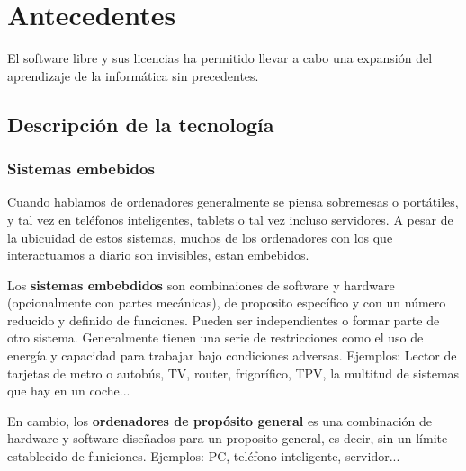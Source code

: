 \chapter{Antecedentes}


El software libre y sus licencias \cite{gplv3} ha permitido llevar a cabo una expansión del
aprendizaje de la informática sin precedentes.

\section{Descripción de la tecnología}
\subsection{Sistemas embebidos}
Cuando hablamos de ordenadores generalmente se piensa sobremesas o portátiles, y tal vez en teléfonos inteligentes, tablets o tal vez incluso servidores. A pesar de la ubicuidad de estos sistemas, muchos de los ordenadores con los que interactuamos a diario son invisibles, estan embebidos.

Los \textbf{sistemas embebdidos} son combinaiones de software y hardware (opcionalmente con partes mecánicas), de proposito específico y con un número reducido y definido de funciones. Pueden ser independientes o formar parte de otro sistema. Generalmente tienen una serie de restricciones como el uso de energía y capacidad para trabajar bajo condiciones adversas. Ejemplos: Lector de tarjetas de metro o autobús, TV, router, frigorífico, TPV, la multitud de sistemas que hay en un coche... \cite{es_glossary} \cite{marwedel}

En cambio, los \textbf{ordenadores de propósito general} es una combinación de hardware y software diseñados para un proposito general, es decir, sin un límite establecido de funiciones. Ejemplos: PC, teléfono inteligente, servidor... \cite{es_glossary}

